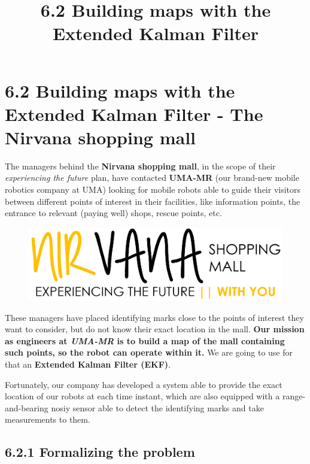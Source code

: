 \documentclass[11pt]{article}
\title{6.2 Building maps with the Extended Kalman Filter}
\begin{document}
    
    \maketitle
    
    

    
    \hypertarget{building-maps-with-the-extended-kalman-filter---the-nirvana-shopping-mall}{%
\section{6.2 Building maps with the Extended Kalman Filter - The Nirvana
shopping
mall}\label{building-maps-with-the-extended-kalman-filter---the-nirvana-shopping-mall}}

The managers behind the \textbf{{Nirvana shopping mall}}, in the scope
of their \emph{experiencing the future} plan, have contacted
\textbf{{UMA-MR}} (our brand-new mobile robotics company at UMA) looking
for mobile robots able to guide their visitors between different points
of interest in their facilities, like information points, the entrance
to relevant (paying well) shops, rescue points, etc.

\begin{figure}
\centering
\includegraphics{nirvana-logo.png}
\end{figure}


These managers have placed identifying marks close to the points of
interest they want to consider, but do not know their exact location in
the mall. \textbf{Our mission as engineers at \emph{UMA-MR} is to build
a map of the mall containing such points, so the robot can operate
within it.} We are going to use for that an \textbf{Extended Kalman
Filter (EKF)}.

Fortunately, our company has developed a system able to provide the
exact location of our robots at each time instant, which are also
equipped with a range-and-bearing nosiy sensor able to detect the
identifying marks and take measurements to them.

    \hypertarget{formalizing-the-problem}{%
\subsection{6.2.1 Formalizing the
problem}\label{formalizing-the-problem}}
\end{document}

